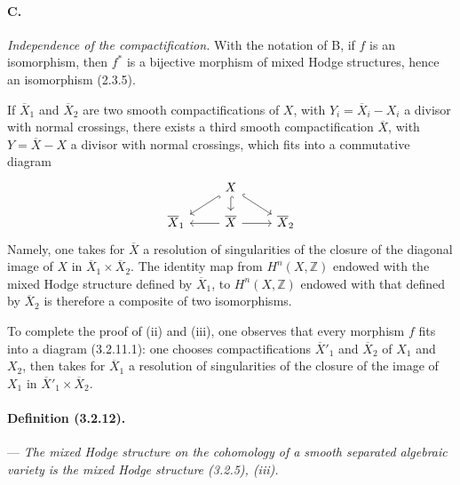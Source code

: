 \documentclass[10pt]{article}
\newcommand{\Z}{\mathbb Z}
\begin{document}
\paragraph{C.} \textit{Independence of the compactification.} With the notation of B, if $f$ is an isomorphism, then $f^*$ is a bijective morphism of mixed Hodge structures, hence an isomorphism (2.3.5).

If $\overline X_1$ and $\overline X_2$ are two smooth compactifications of $X$, with $Y_i=\overline X_i-X_i$ a divisor with normal crossings, there exists a third smooth compactification $\overline X$, with $Y=\overline X-X$ a divisor with normal crossings, which fits into a commutative diagram
\[
\begin{tikzcd}[row sep=1.2em,column sep=2.4em]
& X \arrow[hook,dl] \arrow[hook,d] \arrow[hook,dr] & \\
\overline X_1 & \overline X \arrow[l] \arrow[r] & \overline X_2
\end{tikzcd}
\]
Namely, one takes for $\overline X$ a resolution of singularities of the closure of the diagonal image of $X$ in $\overline X_1\times\overline X_2$. The identity map from $H^n(X,\Z)$ endowed with the mixed Hodge structure defined by $\overline X_1$, to $H^n(X,\Z)$ endowed with that defined by $\overline X_2$ is therefore a composite of two isomorphisms.

To complete the proof of (ii) and (iii), one observes that every morphism $f$ fits into a diagram (3.2.11.1): one chooses compactifications $\overline X'_1$ and $\overline X_2$ of $X_1$ and $X_2$, then takes for $\overline X_1$ a resolution of singularities of the closure of the image of $X_1$ in $\overline X'_1\times\overline X_2$.

\paragraph{Definition (3.2.12).} --- {\itshape The mixed Hodge structure on the cohomology of a smooth separated algebraic variety is the mixed Hodge structure (3.2.5), (iii).}
\end{document}
